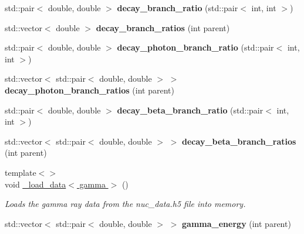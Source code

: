 \begin{DoxyCompactItemize}
\item 
\mbox{\label{namespacepyne_a36c4d1c03c50dc3a1b979b740e44fdc6}} 
std\+::pair$<$ double, double $>$ {\bfseries decay\+\_\+branch\+\_\+ratio} (std\+::pair$<$ int, int $>$)
\item 
\mbox{\label{namespacepyne_a14334fe7674faca75d40f5864b5fb1c1}} 
std\+::vector$<$ double $>$ {\bfseries decay\+\_\+branch\+\_\+ratios} (int parent)
\item 
\mbox{\label{namespacepyne_a52dacedebd3759972e8eaba92415d6a6}} 
std\+::pair$<$ double, double $>$ {\bfseries decay\+\_\+photon\+\_\+branch\+\_\+ratio} (std\+::pair$<$ int, int $>$)
\item 
\mbox{\label{namespacepyne_a56c577e234113f0b8068882018072888}} 
std\+::vector$<$ std\+::pair$<$ double, double $>$ $>$ {\bfseries decay\+\_\+photon\+\_\+branch\+\_\+ratios} (int parent)
\item 
\mbox{\label{namespacepyne_a2da9236f7356b5fd67adc01777af6769}} 
std\+::pair$<$ double, double $>$ {\bfseries decay\+\_\+beta\+\_\+branch\+\_\+ratio} (std\+::pair$<$ int, int $>$)
\item 
\mbox{\label{namespacepyne_aef5ed08c65dbe62f9da6f7206772f7e5}} 
std\+::vector$<$ std\+::pair$<$ double, double $>$ $>$ {\bfseries decay\+\_\+beta\+\_\+branch\+\_\+ratios} (int parent)
\item 
\mbox{\label{namespacepyne_af3c61532d2b2c56c5f2a0c1c2777b541}} 
{\footnotesize template$<$$>$ }\\void \hyperlink{namespacepyne_af3c61532d2b2c56c5f2a0c1c2777b541}{\+\_\+load\+\_\+data$<$ gamma $>$} ()
\begin{DoxyCompactList}\small\item\em Loads the gamma ray data from the nuc\+\_\+data.\+h5 file into memory. \end{DoxyCompactList}\item 
\mbox{\label{namespacepyne_a06f0af84c68fa27a8c2b091f1018fbf7}} 
std\+::vector$<$ std\+::pair$<$ double, double $>$ $>$ {\bfseries gamma\+\_\+energy} (int parent)
\item 

\end{DoxyCompactItemize}
